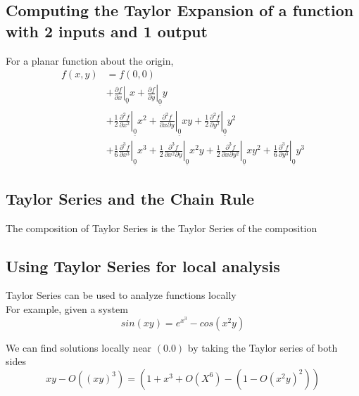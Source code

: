 \subsection{Computing the Taylor Expansion of a function with 2 inputs and 1 output}

\begin{framed}
   For a planar function about the origin, 
   \begin{align*}
      f(x, y) &= f(0,0)  \\
              &+ \left. \frac{\partial f}{\partial x} \right|_{ \underline{0}} x + \left. \frac{\partial f}{\partial y} \right|_{ \underline{0}} y \\
              &+ \frac{1}{2} \left. \frac{\partial^2 f}{\partial x^2} \right|_{ \underline{0}} x^2 
                 + \left. \frac{\partial^2 f}{\partial x \partial y} \right|_{ \underline{0} } xy + \frac{1}{2} \left. \frac{\partial^2f }{\partial y^2} \right|_{ \underline{0}} y^2 \\
              &+ \frac{1}{6} \left. \frac{\partial^3 f}{\partial x^3} \right|_{ \underline{0}} x^3 + \frac{1}{2} \left. \frac{\partial^3 f}{\partial x^2 \partial y} \right|_{ \underline{0}} x^2 y + \frac{1}{2} \left. \frac{\partial^3 f}{\partial x \partial y^2} \right|_{ \underline{0}} xy^2 + \frac{1}{6} \left. \frac{\partial^3 f}{\partial y^3} \right|_{ \underline{0}} y^3
   \end{align*}
\end{framed}

\subsection{Taylor Series and the Chain Rule}
\begin{framed}
   The composition of Taylor Series is the Taylor Series of the composition
\end{framed}

\subsection{Using Taylor Series for local analysis}

Taylor Series can be used to analyze functions locally \\

For example, given a system
\[
   sin(xy) = e^{x^3} - cos(x^2y)
\] 

We can find solutions locally near $(0.0)$ by taking the Taylor series of both sides
\[
  xy - O((xy)^3) = \left( 1+ x^3 + O(X^6) - (1- O(x^2y)^2) \right)
\] 

